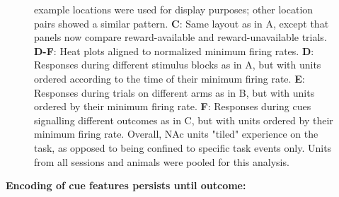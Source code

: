 \documentclass[11pt]{article}
\newcommand{\bsf}[1]{\textbf{#1}}
\begin{document}
\begin{figure}
{example locations were used for display purposes; other location pairs showed
a similar pattern. \bsf{C}: Same layout as in A, except that panels now
compare reward-available and reward-unavailable trials. \bsf{D-F}: Heat plots
aligned to normalized minimum firing rates. \bsf{D}: Responses during
different stimulus blocks as in A, but with units ordered according to the
time of their minimum firing rate. \bsf{E}: Responses during trials on
different arms as in B, but with units ordered by their minimum firing
rate. \bsf{F}: Responses during cues signalling different outcomes as in C,
but with units ordered by their minimum firing rate. Overall, NAc units
"tiled" experience on the task, as opposed to being confined to specific task
events only. Units from all sessions and animals were pooled for this
analysis.}
\label{fig:tiling}
\end{figure}
{\bf Encoding of cue features persists until outcome:}
\end{document}
